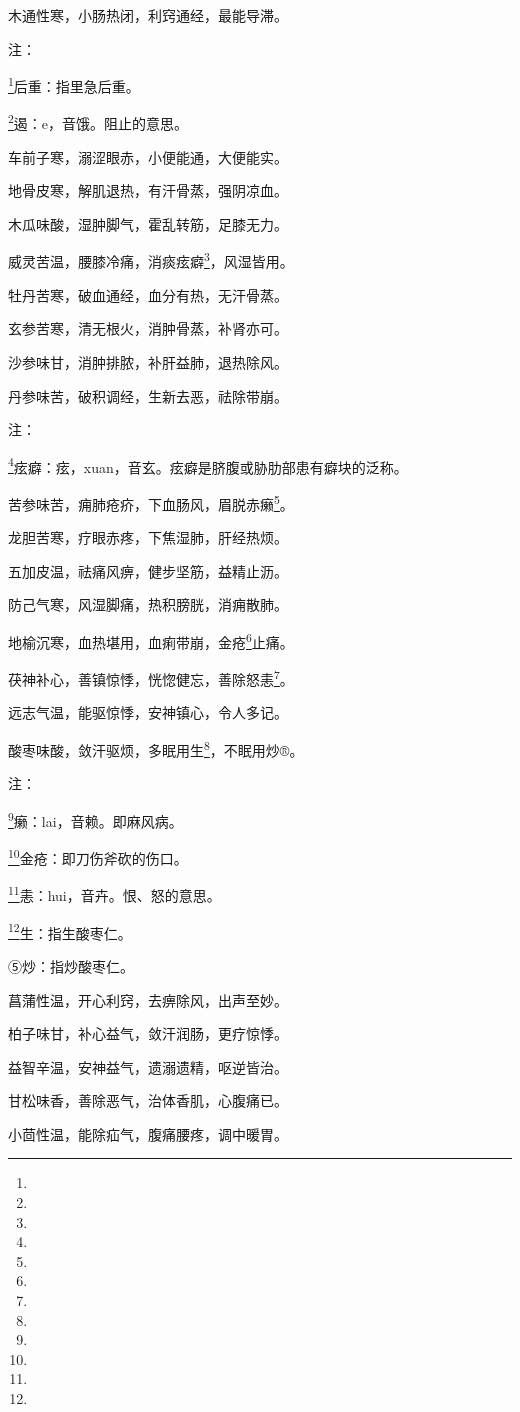 \documentclass[a4paper,12pt,UTF8,twoside]{ctexbook}
\begin{document}
木通性寒，小肠热闭，利窍通经，最能导滞。

注：

\footnote{}后重：指里急后重。

\footnote{}遏：e，音饿。阻止的意思。

车前子寒，溺涩眼赤，小便能通，大便能实。

地骨皮寒，解肌退热，有汗骨蒸，强阴凉血。

木瓜味酸，湿肿脚气，霍乱转筋，足膝无力。

威灵苦温，腰膝冷痛，消痰痃癖\footnote{}，风湿皆用。

牡丹苦寒，破血通经，血分有热，无汗骨蒸。

玄参苦寒，清无根火，消肿骨蒸，补肾亦可。

沙参味甘，消肿排脓，补肝益肺，退热除风。

丹参味苦，破积调经，生新去恶，祛除带崩。

注：

\footnote{}痃癖：痃，xuan，音玄。痃癖是脐腹或胁肋部患有癖块的泛称。

苦参味苦，痈肺疮疥，下血肠风，眉脱赤癞\footnote{}。

龙胆苦寒，疗眼赤疼，下焦湿肺，肝经热烦。

五加皮温，祛痛风痹，健步坚筋，益精止沥。

防己气寒，风湿脚痛，热积膀胱，消痈散肺。

地榆沉寒，血热堪用，血痢带崩，金疮\footnote{}止痛。

茯神补心，善镇惊悸，恍惚健忘，善除怒恚\footnote{}。

远志气温，能驱惊悸，安神镇心，令人多记。

酸枣味酸，敛汗驱烦，多眠用生\footnote{}，不眠用炒®。

注：

\footnote{}癞：lai，音赖。即麻风病。

\footnote{}金疮：即刀伤斧砍的伤口。

\footnote{}恚：hui，音卉。恨、怒的意思。

\footnote{}生：指生酸枣仁。

⑤炒：指炒酸枣仁。

菖蒲性温，开心利窍，去痹除风，出声至妙。

柏子味甘，补心益气，敛汗润肠，更疗惊悸。

益智辛温，安神益气，遗溺遗精，呕逆皆治。

甘松味香，善除恶气，治体香肌，心腹痛已。

小茴性温，能除疝气，腹痛腰疼，调中暖胃。
\end{document}

